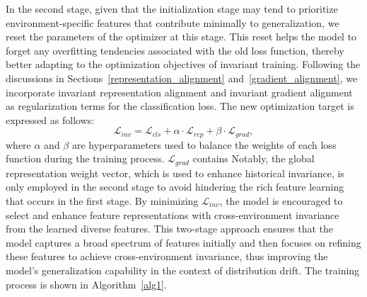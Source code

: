 In the second stage, given that the initialization stage may tend to prioritize environment-specific features that contribute minimally to generalization, we reset the parameters of the optimizer at this stage. This reset helps the model to forget any overfitting tendencies associated with the old loss function, thereby better adapting to the optimization objectives of invariant training. Following the discussions in Sections~\ref{representation_alignment} and~\ref{gradient_alignment}, we incorporate invariant representation alignment and invariant gradient alignment as regularization terms for the classification loss. The new optimization target is expressed as follows:
\begin{equation}
\mathcal{L}_{inv} = \mathcal{L}_{cls} + \alpha \cdot \mathcal{L}_{rep} + \beta \cdot \mathcal{L}_{grad},
\end{equation}
where $\alpha$ and $\beta$ are hyperparameters used to balance the weights of each loss function during the training process. $\mathcal{L}_{grad}$ contains  Notably, the global representation weight vector, which is used to enhance historical invariance, is only employed in the second stage to avoid hindering the rich feature learning that occurs in the first stage. By minimizing $\mathcal{L}_{inv}$, the model is encouraged to select and enhance feature representations with cross-environment invariance from the learned diverse features. This two-stage approach ensures that the model captures a broad spectrum of features initially and then focuses on refining these features to achieve cross-environment invariance, thus improving the model's generalization capability in the context of distribution drift. The training process is shown in Algorithm~\ref{alg1}.




